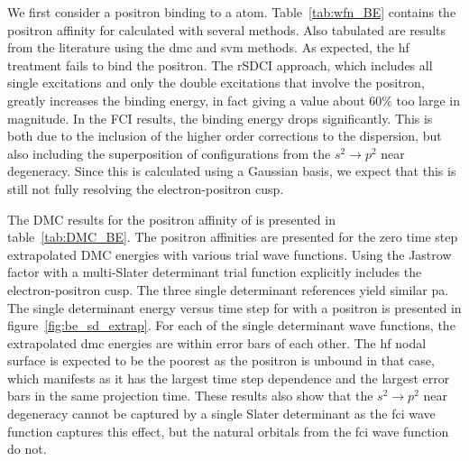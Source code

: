We first consider a positron binding to a  atom. 
Table~\ref{tab:wfn_BE} contains the positron affinity for  calculated with several methods.
Also tabulated are results from the literature using the \gls{dmc} and \gls{svm} methods.
As expected, the \gls{hf} treatment fails to bind the positron.
The \gls{rSDCI} approach, which includes all single excitations and only the double excitations that involve the positron, greatly increases the binding energy, in fact giving a value about 60\% too large in magnitude.
In the FCI results, the binding energy drops significantly.
This is both due to the inclusion of the higher order corrections to the dispersion, but also including the superposition of configurations from the $s^2 \rightarrow p^2$ near degeneracy.
Since this is calculated using a Gaussian basis, we expect that this is still not fully resolving the electron-positron cusp.

The DMC results for the positron affinity of  is presented in table~\ref{tab:DMC_BE}.
The positron affinities are presented for the zero time step extrapolated DMC energies with various trial wave functions.
Using the Jastrow factor with a multi-Slater determinant trial function explicitly includes the electron-positron cusp.
The three single determinant references yield similar \gls{pa}.
The single determinant energy versus time step for  with a positron is presented in figure~\ref{fig:be_sd_extrap}.
For each of the single determinant wave functions, the extrapolated \gls{dmc} energies are within error bars of each other.
The \gls{hf} nodal surface is expected to be the poorest as the positron is unbound in that case, which manifests as it has the largest time step dependence and the largest error bars in the same projection time.
These results also show that the $s^2 \rightarrow p^2$ near degeneracy cannot be captured by a single Slater determinant as the \gls{fci} wave function captures this effect, but the natural orbitals from the \gls{fci} wave function do not.


